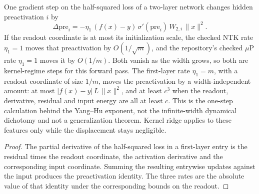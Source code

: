 \begin{lemma}\label{lem:feature_step}
\leanok
{}
One gradient step on the half-squared loss of a two-layer network changes hidden preactivation $i$ by
\[
\Delta\mathrm{pre}_i
=
-\eta_1\,(f(x)-y)\,\sigma'(\mathrm{pre}_i)\,W_{2,i}\,\|x\|^2.
\]
If the readout coordinate is at most its initialization scale, the checked NTK rate $\eta_1=1$ moves that preactivation by $O(1/\sqrt{m})$, and the repository's checked $\mu$P rate $\eta_1=1$ moves it by $O(1/m)$. Both vanish as the width grows, so both are kernel-regime steps for this forward pass. The first-layer rate $\eta_1=m$, with a readout coordinate of size $1/m$, moves the preactivation by a width-independent amount: at most $|f(x)-y|\,L\,\|x\|^2$, and at least $c^3$ when the readout, derivative, residual and input energy are all at least $c$. This is the one-step calculation behind the Yang--Hu exponent, not the infinite-width dynamical dichotomy and not a generalization theorem. Kernel ridge applies to these features only while the displacement stays negligible.
\end{lemma}
\begin{proof}
\leanok
The partial derivative of the half-squared loss in a first-layer entry is the residual times the readout coordinate, the activation derivative and the corresponding input coordinate. Summing the resulting entrywise updates against the input produces the preactivation identity. The three rates are the absolute value of that identity under the corresponding bounds on the readout.
\end{proof}

